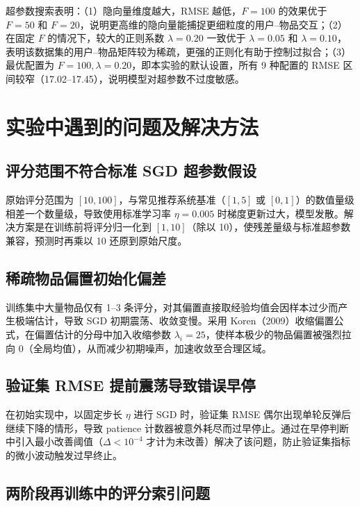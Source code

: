 \documentclass[UTF8,a4paper,10pt]{ctexart}
\newcommand{\xiaosi}{\fontsize{12pt}{20pt}\selectfont}
\begin{document}
超参数搜索表明：（1）隐向量维度越大，RMSE 越低，$F=100$ 的效果优于 $F=50$ 和 $F=20$，说明更高维的隐向量能捕捉更细粒度的用户--物品交互；（2）在固定 $F$ 的情况下，较大的正则系数 $\lambda=0.20$ 一致优于 $\lambda=0.05$ 和 $\lambda=0.10$，表明该数据集的用户--物品矩阵较为稀疏，更强的正则化有助于控制过拟合；（3）最优配置为 $F=100, \lambda=0.20$，即本实验的默认设置，所有 9 种配置的 RMSE 区间较窄（17.02--17.45），说明模型对超参数不过度敏感。

\section{实验中遇到的问题及解决方法}
\xiaosi

\subsection{评分范围不符合标准 SGD 超参数假设}

原始评分范围为 $[10, 100]$，与常见推荐系统基准（$[1, 5]$ 或 $[0, 1]$）的数值量级相差一个数量级，导致使用标准学习率 $\eta = 0.005$ 时梯度更新过大，模型发散。解决方案是在训练前将评分归一化到 $[1, 10]$（除以 10），使残差量级与标准超参数兼容，预测时再乘以 10 还原到原始尺度。

\subsection{稀疏物品偏置初始化偏差}

训练集中大量物品仅有 1--3 条评分，对其偏置直接取经验均值会因样本过少而产生极端估计，导致 SGD 初期震荡、收敛变慢。采用 Koren（2009）收缩偏置公式，在偏置估计的分母中加入收缩参数 $\lambda_i = 25$，使样本极少的物品偏置被强烈拉向 0（全局均值），从而减少初期噪声，加速收敛至合理区域。

\subsection{验证集 RMSE 提前震荡导致错误早停}

在初始实现中，以固定步长 $\eta$ 进行 SGD 时，验证集 RMSE 偶尔出现单轮反弹后继续下降的情形，导致 patience 计数器被意外耗尽而过早停止。通过在早停判断中引入最小改善阈值（$\Delta < 10^{-4}$ 才计为未改善）解决了该问题，防止验证集指标的微小波动触发过早终止。

\subsection{两阶段再训练中的评分索引问题}
\end{document}
